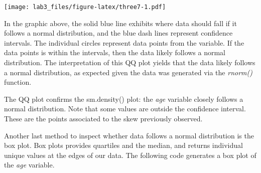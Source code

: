 \documentclass[]{article}
\newenvironment{Shaded}{\begin{snugshade}}{\end{snugshade}}
\newcommand{\KeywordTok}[1]{\textcolor[rgb]{0.13,0.29,0.53}{\textbf{#1}}}
\newcommand{\DataTypeTok}[1]{\textcolor[rgb]{0.13,0.29,0.53}{#1}}
\newcommand{\DecValTok}[1]{\textcolor[rgb]{0.00,0.00,0.81}{#1}}
\newcommand{\FloatTok}[1]{\textcolor[rgb]{0.00,0.00,0.81}{#1}}
\newcommand{\StringTok}[1]{\textcolor[rgb]{0.31,0.60,0.02}{#1}}
\newcommand{\CommentTok}[1]{\textcolor[rgb]{0.56,0.35,0.01}{\textit{#1}}}
\newcommand{\OperatorTok}[1]{\textcolor[rgb]{0.81,0.36,0.00}{\textbf{#1}}}
\newcommand{\NormalTok}[1]{#1}
\begin{document}
\begin{Shaded}
\end{Shaded}

\texttt{[image: lab3\_files/figure-latex/three7-1.pdf]}

In the graphic above, the solid blue line exhibits where data should
fall if it follows a normal distribution, and the blue dash lines
represent confidence intervals. The individual circles represent data
points from the variable. If the data points is within the intervals,
then the data likely follows a normal distribution. The interpretation
of this QQ plot yields that the data likely follows a normal
distribution, as expected given the data was generated via the
\emph{rnorm()} function.

The QQ plot confirms the sm.density() plot: the \emph{age} variable
closely follows a normal distribution. Note that some values are outside
the confidence interval. These are the points associated to the skew
previously observed.

Another last method to inspect whether data follows a normal
distribution is the box plot. Box plots provides quartiles and the
median, and returns individual unique values at the edges of our data.
The following code generates a box plot of the \emph{age} variable.
\end{document}
